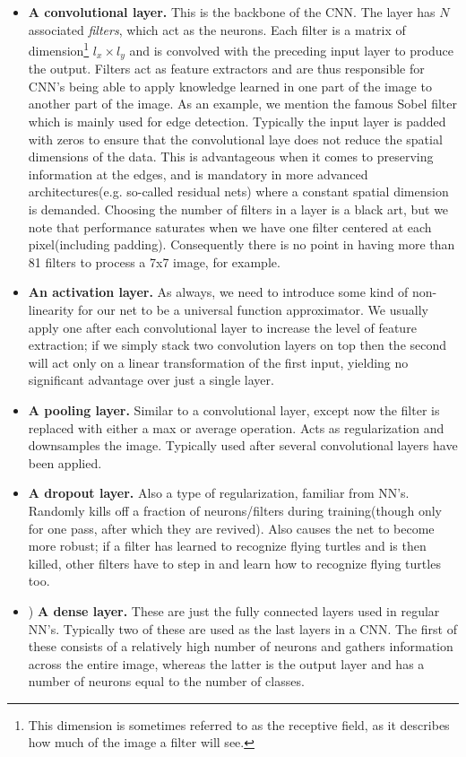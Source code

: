 \documentclass[]{article}
\begin{document}
\begin{itemize}
	\item[1)] \textbf{A convolutional layer.} This is the backbone of the CNN. The layer has $N$ associated \textit{filters}, which act as the neurons. Each filter is a matrix of dimension\footnote{This dimension is sometimes referred to as the receptive field, as it describes how much of the image a filter will see.} $l_x\times l_y$ and is convolved with the preceding input layer to produce the output. Filters act as feature extractors and are thus responsible for CNN's being able to apply knowledge learned in one part of the image to another part of the image. As an example, we mention the famous Sobel filter which is mainly used for edge detection.  Typically the input layer is padded with zeros to ensure that the convolutional laye does not reduce the spatial dimensions of the data. This is advantageous when it comes to preserving information at the edges, and is mandatory in more advanced architectures(e.g. so-called residual nets) where a constant spatial dimension is demanded. Choosing the number of filters in a layer is a black art, but we note that performance saturates when we have one filter centered at each pixel(including padding). Consequently there is no point in having more than 81 filters to process a 7x7 image, for example.
	\item[2)] \textbf{An activation layer.} As always, we need to introduce some kind of non-linearity for our net to be a universal function approximator. We usually apply one after each convolutional layer to increase the level of feature extraction; if we simply stack two convolution layers on top then the second will act only on a linear transformation of the first input, yielding no significant advantage over just a single layer. 
	\item[3)] \textbf{A pooling layer.} Similar to a convolutional layer, except now the filter is replaced with either a max or average operation. Acts as regularization and downsamples the image. Typically used after several convolutional layers have been applied. 
	\item[4)] \textbf{A dropout layer.} Also a type of regularization, familiar from NN's. Randomly kills off a fraction of neurons/filters during training(though only for one pass, after which they are revived). Also causes the net to become more robust; if a filter has learned to recognize flying turtles and is then killed, other filters have to step in and learn how to recognize flying turtles too.
	\item[4]) \textbf{A dense layer.} These are just the fully connected layers used in regular NN's. Typically two of these are used as the last layers in a CNN. The first of these consists of a relatively high number of neurons and gathers information across the entire image, whereas the latter is the output layer and has a number of neurons equal to the number of classes.
\end{itemize}
\end{document}

